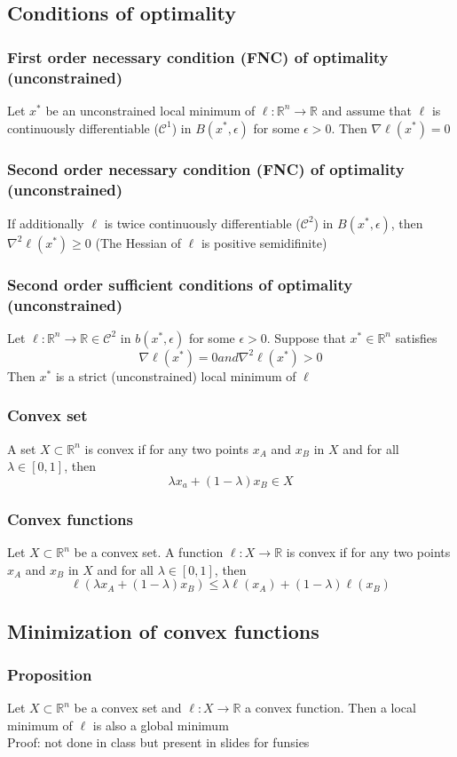 \documentclass{book}
\newcommand{\R}{\mathbb{R}}
\theoremstyle{definition}
\theoremstyle{remark}
\theoremstyle{remark}
\begin{document}
\subsection{Conditions of optimality}
\subsubsection{First order necessary condition (FNC) of optimality (unconstrained)}
Let $x^*$ be an unconstrained local minimum of $\ell:\R^n\to\R$ and assume that $\ell$ is continuously differentiable ($\mathcal{C}^1$) in $B(x^*,\epsilon)$ for some $\epsilon>0$. Then $\nabla \ell(x^*)=0$
\subsubsection{Second order necessary condition (FNC) of optimality (unconstrained)}
If additionally $\ell$ is twice continuously differentiable ($\mathcal{C}^2$) in $B(x^*,\epsilon)$, then $\nabla^2 \ell(x^*)\geq 0$ (The Hessian of $\ell$ is positive semidifinite)
\subsubsection{Second order sufficient conditions of optimality (unconstrained)}
Let $\ell:\R^n\to\R\in\mathcal{C}^2$ in $b(x^*,\epsilon)$ for some $\epsilon>0$. Suppose that $x^*\in\R^n$ satisfies 
\[
    \nabla\ell(x^*) = 0 and \nabla^2\ell(x^*)>0
\]
Then $x^*$ is a strict (unconstrained) local minimum of $\ell$
\subsubsection{Convex set} 
A set $X\subset \R^n$ is convex if for any two points $x_A$ and $x_B$ in $X$ and for all $\lambda\in[0,1]$, then 
\[
    \lambda x_a+(1-\lambda)x_B \in X
\]
\subsubsection{Convex functions}
Let $X \subset \R^n$ be a convex set. A function $\ell:X\to\R$ is convex if for any two points $x_A$ and $x_B$ in $X$ and for all $\lambda\in[0,1]$, then 
\[
    \ell(\lambda x_A + (1-\lambda)x_B)\leq \lambda\ell(x_A)+ (1-\lambda)\ell(x_B)
\]
\subsection{Minimization of convex functions}
\subsubsection{Proposition}
Let $X\subset\R^n$ be a convex set and $\ell: X\to\R$ a convex function. Then a local minimum of $\ell$ is also a global minimum \\
Proof: not done in class but present in slides for funsies
\end{document}

